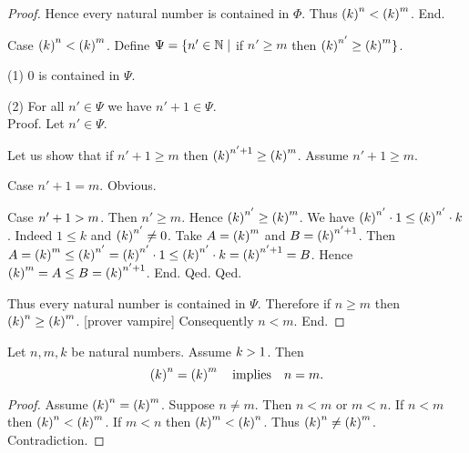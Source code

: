 \documentclass[../arithmetic.tex]{subfiles}
\begin{document}
\begin{forthel}
\begin{proof}
        Hence every natural number is contained in $\Phi$.
        Thus $\left(k\right)^{n} < \left(k\right)^{m}$.
      End.

      Case $\left(k\right)^{n} < \left(k\right)^{m}$.
        Define $\Psi = \{ n' \in \mathbb{N} \mid$ if $n' \geq m$ then
        $\left(k\right)^{n'} \geq \left(k\right)^{m} \}$.

        (1) $0$ is contained in $\Psi$.

        (2) For all $n' \in \Psi$ we have $n' \plus 1 \in \Psi$. \\
        Proof.
          Let $n' \in \Psi$.

          Let us show that if $n' \plus 1 \geq m$ then $\left(k\right)^{n' + 1} \geq \left(k\right)^{m}$.
            Assume $n' \plus 1 \geq m$.

            Case $n' \plus 1 = m$. Obvious.

            Case $n' + 1 > m$.
              Then $n' \geq m$.
              Hence $\left(k\right)^{n'} \geq \left(k\right)^{m}$.
              We have $\left(k\right)^{n'} \cdot 1 \leq \left(k\right)^{n'} \cdot k$.
              Indeed $1 \leq k$ and $\left(k\right)^{n'} \neq 0$.
              Take $A = \left(k\right)^{m}$ and $B = \left(k\right)^{n' + 1}$. %
              Then $A
                = \left(k\right)^{m}
                \leq \left(k\right)^{n'}
                = \left(k\right)^{n'} \cdot 1
                \leq \left(k\right)^{n'} \cdot k
                = \left(k\right)^{n' + 1}
                = B$.
              Hence $\left(k\right)^{m} = A \leq B = \left(k\right)^{n' + 1}$.
            End.
          Qed.
        Qed.

        Thus every natural number is contained in $\Psi$.
        Therefore if $n \geq m$ then $\left(k\right)^{n} \geq \left(k\right)^{m}$.
        [prover vampire]
        Consequently $n \less m$.
      End.
    \end{proof}
  \end{forthel}

  \begin{forthel}
    \begin{corollary}
      Let $n, m, k$ be natural numbers.
      Assume $k > 1$.
      Then \[ \left(k\right)^{n} = \left(k\right)^{m} \quad \text{implies} \quad n = m. \]
    \end{corollary}
    \begin{proof}
      Assume $\left(k\right)^{n} = \left(k\right)^{m}$.
      Suppose $n \neq m$.
      Then $n \less m$ or $m \less n$.
      If $n \less m$ then $\left(k\right)^{n} < \left(k\right)^{m}$.
      If $m \less n$ then $\left(k\right)^{m} < \left(k\right)^{n}$.
      Thus $\left(k\right)^{n} \neq \left(k\right)^{m}$.
      Contradiction.
    \end{proof}
  \end{forthel}
\end{document}
